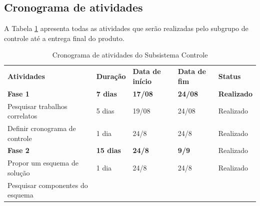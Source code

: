 \subsection{Cronograma de atividades}

A Tabela \ref{tab:cronograma_controle} apresenta todas as atividades que serão realizadas pelo subgrupo de controle até a entrega final do produto.

\begin{table}[!htbp]
 \centering
 \caption{Cronograma de atividades do Subsistema Controle} \label{tab:cronograma_controle}
 {\renewcommand\arraystretch{1.25}
 \begin{tabular}{ l l l l l }
  \cline{1-1}\cline{2-2}\cline{3-3}\cline{4-4}\cline{5-5}  
    \multicolumn{1}{|p{6.900cm}|}{\textbf{Atividades}} &
    \multicolumn{1}{p{1.817cm}|}{\textbf{Duração}} &
    \multicolumn{1}{p{1.650cm}|}{\textbf{Data de início}} &
    \multicolumn{1}{p{1.550cm}|}{\textbf{Data de fim}} &
    \multicolumn{1}{p{2.000cm}|}{\textbf{Status}}
  \\  
  \cline{1-1}\cline{2-2}\cline{3-3}\cline{4-4}\cline{5-5}  
    \multicolumn{1}{|p{6.900cm}|}{\textbf{Fase 1}} &
    \multicolumn{1}{p{1.817cm}|}{\textbf{7 dias}} &
    \multicolumn{1}{p{1.650cm}|}{\textbf{17/08}} &
    \multicolumn{1}{p{1.550cm}|}{\textbf{24/08}} &
    \multicolumn{1}{p{2.000cm}|}{\textbf{Realizado}}
  \\  
  \cline{1-1}\cline{2-2}\cline{3-3}\cline{4-4}\cline{5-5}  
    \multicolumn{1}{|p{6.900cm}|}{Pesquisar trabalhos correlatos} &
    \multicolumn{1}{p{1.817cm}|}{5 dias} &
    \multicolumn{1}{p{1.650cm}|}{19/08} &
    \multicolumn{1}{p{1.550cm}|}{24/08} &
    \multicolumn{1}{p{2.000cm}|}{Realizado}
  \\  
  \cline{1-1}\cline{2-2}\cline{3-3}\cline{4-4}\cline{5-5}  
    \multicolumn{1}{|p{6.900cm}|}{Definir cronograma de controle} &
    \multicolumn{1}{p{1.817cm}|}{1 dia} &
    \multicolumn{1}{p{1.650cm}|}{24/8} &
    \multicolumn{1}{p{1.550cm}|}{24/8} &
    \multicolumn{1}{p{2.000cm}|}{Realizado}
  \\  
  \cline{1-1}\cline{2-2}\cline{3-3}\cline{4-4}\cline{5-5}  
    \multicolumn{1}{|p{6.900cm}|}{\textbf{Fase 2}} &
    \multicolumn{1}{p{1.817cm}|}{\textbf{15 dias}} &
    \multicolumn{1}{p{1.650cm}|}{\textbf{24/8}} &
    \multicolumn{1}{p{1.550cm}|}{\textbf{9/9}} &
    \multicolumn{1}{p{2.000cm}|}{Realizado}
  \\  
  \cline{1-1}\cline{2-2}\cline{3-3}\cline{4-4}\cline{5-5}  
    \multicolumn{1}{|p{6.900cm}|}{Propor um esquema de solução} &
    \multicolumn{1}{p{1.817cm}|}{1 dia} &
    \multicolumn{1}{p{1.650cm}|}{24/8} &
    \multicolumn{1}{p{1.550cm}|}{24/8} &
    \multicolumn{1}{p{2.000cm}|}{Realizado}
  \\  
  \cline{1-1}\cline{2-2}\cline{3-3}\cline{4-4}\cline{5-5}  
    \multicolumn{1}{|p{6.900cm}|}{Pesquisar componentes do esquema  			

}
\end{tabular}}
\end{table}
